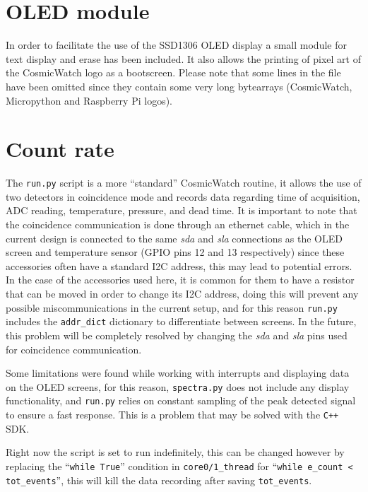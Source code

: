 \section{OLED module}

In order to facilitate the use of the SSD1306 OLED display a small module for text display and erase has been included. It also allows the printing of pixel art of the CosmicWatch logo as a bootscreen. Please note that some lines in the file have been omitted since they contain some very long bytearrays (CosmicWatch, Micropython and Raspberry Pi logos).



\section{Count rate}

The \texttt{run.py} script is a more ``standard'' CosmicWatch routine, it allows the use of two detectors in coincidence mode and records data regarding time of acquisition, ADC reading, temperature, pressure, and dead time. It is important to note that the coincidence communication is done through an ethernet cable, which in the current design is connected to the same \textit{sda} and \textit{sla} connections as the OLED screen and temperature sensor (GPIO pins 12 and 13 respectively) since these accessories often have a standard I2C address, this may lead to potential errors. In the case of the accessories used here, it is common for them to have a resistor that can be moved in order to change its I2C address, doing this will prevent any possible miscommunications in the current setup, and for this reason \texttt{run.py} includes the \texttt{addr\_dict} dictionary to differentiate between screens. In the future, this problem will be completely resolved by changing the \textit{sda} and \textit{sla} pins used for coincidence communication.

Some limitations were found while working with interrupts and displaying data on the OLED screens, for this reason, \texttt{spectra.py} does not include any display functionality, and \texttt{run.py} relies on constant sampling of the peak detected signal to ensure a fast response. This is a problem that may be solved with the \texttt{C++} SDK.

Right now the script is set to run indefinitely, this can be changed however by replacing the ``\texttt{while True}'' condition in \texttt{core0/1\_thread} for ``\texttt{while e\_count < tot\_events}'', this will kill the data recording after saving \texttt{tot\_events}.

